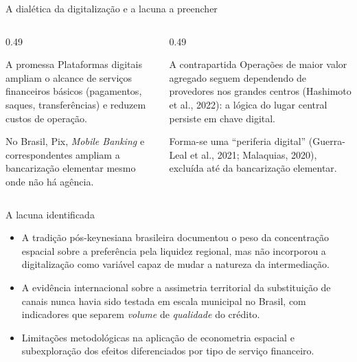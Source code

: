 \documentclass[aspectratio=169,10pt]{beamer}
\begin{document}
\begin{frame}{A dialética da digitalização e a lacuna a preencher}
  \begin{columns}[T]
    \begin{column}{0.49\textwidth}
      \begin{block}{A promessa}
        \small
        Plataformas digitais ampliam o alcance de serviços financeiros básicos
        (pagamentos, saques, transferências) e reduzem custos de operação.

        \smallskip
        No Brasil, Pix, \emph{Mobile Banking} e correspondentes ampliam a
        bancarização elementar mesmo onde não há agência.
      \end{block}
    \end{column}
    \begin{column}{0.49\textwidth}
      \begin{alertblock}{A contrapartida}
        \small
        Operações de maior valor agregado seguem dependendo de provedores nos
        grandes centros (Hashimoto et al., 2022): a lógica do lugar central
        persiste em chave digital.

        \smallskip
        Forma-se uma ``periferia digital'' (Guerra-Leal et al., 2021;
        Malaquias, 2020), excluída até da bancarização elementar.
      \end{alertblock}
    \end{column}
  \end{columns}

  \vspace{0.3em}
  \begin{exampleblock}{A lacuna identificada}
    \footnotesize
    \begin{itemize}\setlength{\itemsep}{0.25em}
      \item A tradição pós-keynesiana brasileira documentou o peso da concentração
            espacial sobre a preferência pela liquidez regional, mas \alert{não
            incorporou a digitalização} como variável capaz de mudar a natureza da
            intermediação.
      \item A evidência internacional sobre a assimetria territorial da substituição
            de canais \alert{nunca havia sido testada em escala municipal no Brasil},
            com indicadores que separem \emph{volume} de \emph{qualidade} do crédito.
      \item Limitações metodológicas na aplicação de econometria espacial e
            subexploração dos efeitos diferenciados por tipo de serviço financeiro.
    \end{itemize}
  \end{exampleblock}
\end{frame}
\end{document}
